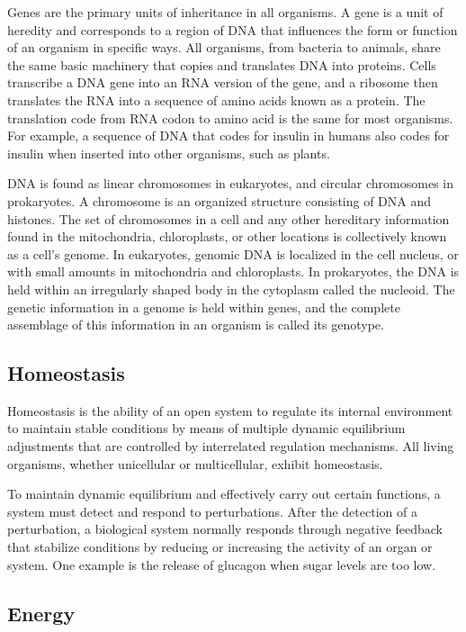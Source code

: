 \documentclass[
]{book}
\begin{document}
Genes are the primary units of inheritance in all organisms. A gene is a unit of heredity and corresponds to a region of DNA that influences the form or function of an organism in specific ways. All organisms, from bacteria to animals, share the same basic machinery that copies and translates DNA into proteins. Cells transcribe a DNA gene into an RNA version of the gene, and a ribosome then translates the RNA into a sequence of amino acids known as a protein. The translation code from RNA codon to amino acid is the same for most organisms. For example, a sequence of DNA that codes for insulin in humans also codes for insulin when inserted into other organisms, such as plants.

DNA is found as linear chromosomes in eukaryotes, and circular chromosomes in prokaryotes. A chromosome is an organized structure consisting of DNA and histones. The set of chromosomes in a cell and any other hereditary information found in the mitochondria, chloroplasts, or other locations is collectively known as a cell's genome. In eukaryotes, genomic DNA is localized in the cell nucleus, or with small amounts in mitochondria and chloroplasts. In prokaryotes, the DNA is held within an irregularly shaped body in the cytoplasm called the nucleoid. The genetic information in a genome is held within genes, and the complete assemblage of this information in an organism is called its genotype.

\hypertarget{homeostasis}{%
\subsection{Homeostasis}\label{homeostasis}}

Homeostasis is the ability of an open system to regulate its internal environment to maintain stable conditions by means of multiple dynamic equilibrium adjustments that are controlled by interrelated regulation mechanisms. All living organisms, whether unicellular or multicellular, exhibit homeostasis.

To maintain dynamic equilibrium and effectively carry out certain functions, a system must detect and respond to perturbations. After the detection of a perturbation, a biological system normally responds through negative feedback that stabilize conditions by reducing or increasing the activity of an organ or system. One example is the release of glucagon when sugar levels are too low.

\hypertarget{energy}{%
\subsection{Energy}\label{energy}}
\end{document}
